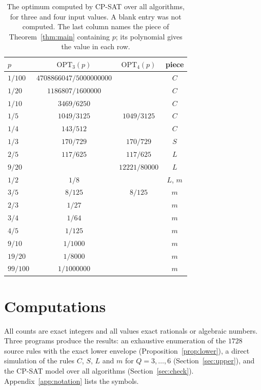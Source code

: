 \documentclass[11pt]{article}
\theoremstyle{remark}
\newcommand{\OPT}{\mathrm{OPT}}
\begin{document}
\begin{table}[tbp]
\centering
\begin{tabular}{lccc}
\toprule
$p$ & $\OPT_3(p)$ & $\OPT_4(p)$ & piece\\
\midrule
$1/100$ & $4708866047/5000000000$ & & $C$\\
$1/20$ & $1186807/1600000$ & & $C$\\
$1/10$ & $3469/6250$ & & $C$\\
$1/5$ & $1049/3125$ & $1049/3125$ & $C$\\
$1/4$ & $143/512$ & & $C$\\
$1/3$ & $170/729$ & $170/729$ & $S$\\
$2/5$ & $117/625$ & $117/625$ & $L$\\
$9/20$ & & $12221/80000$ & $L$\\
$1/2$ & $1/8$ & & $L$, $m$\\
$3/5$ & $8/125$ & $8/125$ & $m$\\
$2/3$ & $1/27$ & & $m$\\
$3/4$ & $1/64$ & & $m$\\
$4/5$ & $1/125$ & & $m$\\
$9/10$ & $1/1000$ & & $m$\\
$19/20$ & $1/8000$ & & $m$\\
$99/100$ & $1/1000000$ & & $m$\\
\bottomrule
\end{tabular}
\caption{The optimum computed by CP-SAT over all algorithms, for three and four input values. A blank entry was not computed. The last column names the piece of Theorem~\ref{thm:main} containing $p$; its polynomial gives the value in each row.}\label{tab:check}
\end{table}

\section{Computations}
All counts are exact integers and all values exact rationals or algebraic numbers. Three programs produce the results: an exhaustive enumeration of the $1728$ source rules with the exact lower envelope (Proposition~\ref{prop:lower}), a direct simulation of the rules $C$, $S$, $L$ and $m$ for $Q=3,\dots,6$ (Section~\ref{sec:upper}), and the CP-SAT model over all algorithms (Section~\ref{sec:check}). Appendix~\ref{app:notation} lists the symbols.
\end{document}
